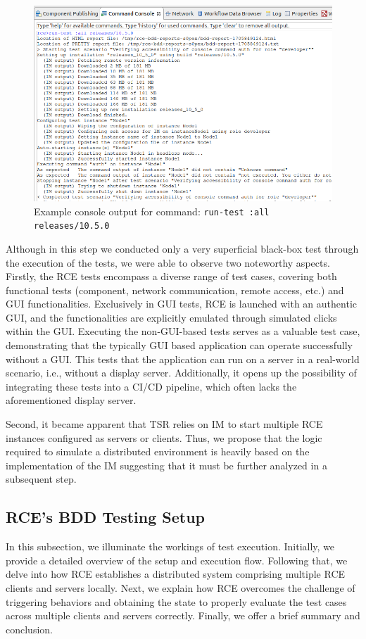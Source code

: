 \begin{figure}
    \centering
    \includegraphics[width=\linewidth]{files/figures/rce-execute-tests.png}
    \caption{Example console output for command: \texttt{run-test :all releases/10.5.0}}
    \label{fig:rce-test-output}
\end{figure}


Although in this step we conducted only a very superficial black-box test through the execution of the tests, we were able to observe two noteworthy aspects. Firstly, the \ac{RCE} tests encompass a diverse range of test cases, covering both functional tests (component, network communication, remote access, etc.) and \ac{GUI} functionalities. Exclusively in \ac{GUI} tests, \ac{RCE} is launched with an authentic \ac{GUI}, and the functionalities are explicitly emulated through simulated clicks within the \ac{GUI}.
Executing the non-\acs{GUI}-based tests serves as a valuable test case, demonstrating that the typically \acs{GUI} based application can operate successfully without a \acs{GUI}. This tests that the application can run on a server in a real-world scenario, i.e., without a display server. Additionally, it opens up the possibility of integrating these tests into a CI/CD pipeline, which often lacks the aforementioned display server.

Second, it became apparent that \ac{TSR} relies on \ac{IM} to start multiple \ac{RCE} instances configured as servers or clients. Thus, we propose that the logic required to simulate a distributed environment is heavily based on the implementation of the \ac{IM} suggesting that it must be further analyzed in a subsequent step.

\subsection{\ac{RCE}'s BDD Testing Setup}
\label{subsec:BuiltinBDDTest}
In this subsection, we illuminate the workings of test execution. Initially, we provide a detailed overview of the setup and execution flow. Following that, we delve into how \ac{RCE} establishes a distributed system comprising multiple \ac{RCE} clients and servers locally. Next, we explain how \ac{RCE} overcomes the challenge of triggering behaviors and obtaining the state to properly evaluate the test cases across multiple clients and servers correctly. Finally, we offer a brief summary and conclusion.

